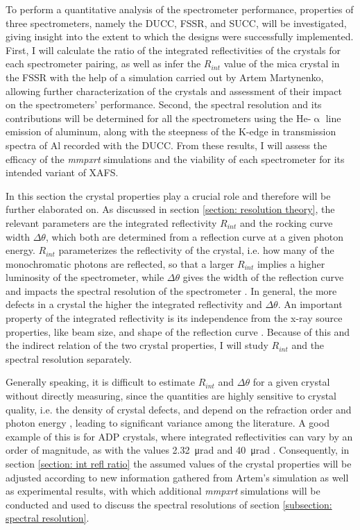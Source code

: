 To perform a quantitative analysis of the spectrometer performance, properties of three spectrometers, namely the DUCC, FSSR, and SUCC, will be investigated, giving insight into the extent to which the designs were successfully implemented. First, I will calculate the ratio of the integrated reflectivities of the crystals for each spectrometer pairing, as well as infer the $R_{int}$ value of the mica crystal in the FSSR with the help of a simulation carried out by Artem Martynenko, allowing further characterization of the crystals and assessment of their impact on the spectrometers' performance. Second, the spectral resolution and its contributions will be determined for all the spectrometers using the He-$\upalpha$ line emission of aluminum, along with the steepness of the K-edge in transmission spectra of Al recorded with the DUCC. From these results, I will assess the efficacy of the \textit{mmpxrt} simulations and the viability of each spectrometer for its intended variant of XAFS.

In this section the crystal properties play a crucial role and therefore will be further elaborated on. As discussed in section \ref{section: resolution theory}, the relevant parameters are the integrated reflectivity $R_{int}$ and the rocking curve width $\Delta \theta$, which both are determined from a reflection curve at a given photon energy. $R_{int}$ parameterizes the reflectivity of the crystal, i.e. how many of the monochromatic photons are reflected, so that a larger $R_{int}$ implies a higher luminosity of the spectrometer, while $\Delta \theta$ gives the width of the reflection curve and impacts the spectral resolution of the spectrometer \citep{holzer1998flat}. In general, the more defects in a crystal the higher the integrated reflectivity and $\Delta \theta$. An important property of the integrated reflectivity is its independence from the x-ray source properties, like beam size, and shape of the reflection curve \citep{loisel2016measurement}. Because of this and the indirect relation of the two crystal properties, I will study $R_{int}$ and the spectral resolution separately.

Generally speaking, it is difficult to estimate $R_{int}$ and $\Delta \theta$ for a given crystal without directly measuring, since the quantities are highly sensitive to crystal quality, i.e. the density of crystal defects, and depend on the refraction order and photon energy \citep{ferrari2019characterization}, leading to significant variance among the literature. A good example of this is for ADP crystals, where integrated reflectivities can vary by an order of magnitude, as with the values \SI{2.32}{\micro\radian} \citep{ferrari2019characterization} and \SI{40}{\micro\radian} \citep{gilfrich1975integral}. Consequently, in section \ref{section: int refl ratio} the assumed values of the crystal properties will be adjusted according to new information gathered from Artem's simulation as well as experimental results, with which additional \textit{mmpxrt} simulations will be conducted and used to discuss the spectral resolutions of section \ref{subsection: spectral resolution}.

